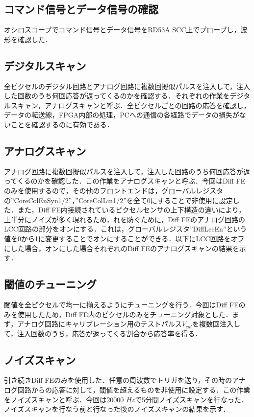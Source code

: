 \subsection{コマンド信号とデータ信号の確認}
オシロスコープでコマンド信号とデータ信号をRD53A SCC上でプローブし，波形を確認した．

\subsection{デジタルスキャン}
全ピクセルのデジタル回路とアナログ回路に複数回擬似パルスを注入して，注入した回数のうち何回応答が返ってくるのかを確認する．それぞれの作業をデジタルスキャン，アナログスキャンと呼ぶ．全ピクセルごとの回路の応答を確認し，データの転送線，FPGA内部の処理，PCへの通信の各経路でデータの損失がないことを確認するのに有効である．

\subsection{アナログスキャン}
アナログ回路に複数回擬似パルスを注入して，注入した回路のうち何回応答が返ってくるのかを確認した．この作業をアナログスキャンと呼ぶ．今回はDiff FEのみを使用するので，その他のフロントエンドは，グローバルレジスタの''CoreColEnSyn1/2''，''CoreColLin1/2''を全て0にすることで非使用に設定した．また，Diff FE内接続されているピクセルセンサの上下構造の違いにより，上半分にノイズが多く現れるため，れを防ぐために，Diff FEのアナログ回路のLCC回路の部分をオンにする．これは，グローバルレジスタ''DiffLccEn''という値を0から1に変更することでオンにすることができる．以下にLCC回路をオフにした場合，オンにした場合それぞれのDiff FEのアナログスキャンの結果を示す．

\subsection{閾値のチューニング}
閾値を全ピクセルで均一に揃えるようにチューニングを行う．今回はDiff FEのみを使用したため，Diff FE内のピクセルのみをチューニング対象とした．まず，アナログ回路にキャリブレーション用のテストパルス$V_{cal}$を複数回注入して，注入回数のうち，応答が返ってくる割合から応答率を得る．

\subsection{ノイズスキャン}
引き続きDiff FEのみを使用した．任意の周波数でトリガを送り，その時のアナログ回路からの応答に対して，閾値を超えるものを非使用に設定する．この作業をノイズスキャンと呼ぶ．今回は20000 $Hz$で5分間ノイズスキャンを行なった．ノイズスキャンを行なう前と行なった後のノイズスキャンの結果を示す．



